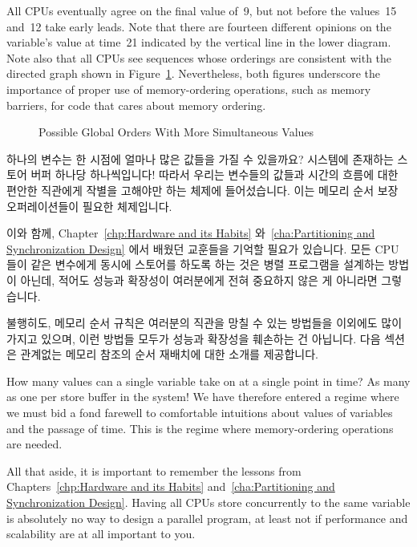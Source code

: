 All CPUs eventually agree on the final value of~9, but not before
the values~15 and~12 take early leads.
Note that there are fourteen different opinions on the variable's value
at time~21 indicated by the vertical line in the lower diagram.
Note also that all CPUs see sequences whose orderings are consistent with
the directed graph shown in
Figure~\ref{fig:memorder:Possible Global Orders With More Simultaneous Values}.
Nevertheless, both figures underscore the importance of
proper use of memory-ordering operations, such as memory barriers,
for code that cares about memory ordering.
\fi

\begin{figure}[htb]
\centering
{}
\caption{Possible Global Orders With More Simultaneous Values}
\label{fig:memorder:Possible Global Orders With More Simultaneous Values}
\end{figure}

하나의 변수는 한 시점에 얼마나 많은 값들을 가질 수 있을까요?
시스템에 존재하는 스토어 버퍼 하나당 하나씩입니다!
따라서 우리는 변수들의 값들과 시간의 흐름에 대한 편안한 직관에게 작별을
고해야만 하는 체제에 들어섰습니다.
이는 메모리 순서 보장 오퍼레이션들이 필요한 체제입니다.

이와 함께,
Chapter~\ref{chp:Hardware and its Habits}
와~\ref{cha:Partitioning and Synchronization Design} 에서 배웠던 교훈들을
기억할 필요가 있습니다.
모든 CPU 들이 같은 변수에게 동시에 스토어를 하도록 하는 것은 병렬 프로그램을
설계하는 방법이 아닌데, 적어도 성능과 확장성이 여러분에게 전혀 중요하지 않은 게
아니라면 그렇습니다.

불행히도, 메모리 순서 규칙은 여러분의 직관을 망칠 수 있는 방법들을 이외에도
많이 가지고 있으며, 이런 방법들 모두가 성능과 확장성을 훼손하는 건 아닙니다.
다음 섹션은 관계없는 메모리 참조의 순서 재배치에 대한 소개를 제공합니다.
\iffalse

How many values can a single variable take on at a single point in
time?
As many as one per store buffer in the system!
We have therefore entered a regime where we must bid a fond farewell to
comfortable intuitions about values of variables and the passage of time.
This is the regime where memory-ordering operations are needed.

All that aside, it is important to remember the lessons from
Chapters~\ref{chp:Hardware and its Habits}
and~\ref{cha:Partitioning and Synchronization Design}.
Having all CPUs store concurrently to the same variable
is absolutely no way to design a parallel program, at least
not if performance and scalability are at all important to you.

